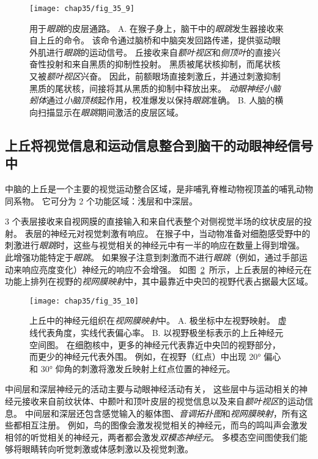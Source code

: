 \begin{figure}[htbp]
	\centering
	\texttt{[image: chap35/fig\_35\_9]}
	\caption{用于\textit{眼跳}的皮层通路。
		A. 在猴子身上，脑干中的\textit{眼跳}发生器接收来自上丘的命令。
		该命令通过脑桥和中脑突发回路传递，提供驱动眼外肌进行\textit{眼跳}的运动信号。
		丘接收来自\textit{额叶视区}和\textit{侧顶叶}的直接兴奋性投射和来自黑质的抑制性投射。
		黑质被尾状核抑制，而尾状核又被\textit{额叶视区}兴奋。
		因此，前额眼场直接刺激丘，并通过刺激抑制黑质的尾状核，间接将其从黑质的抑制中释放出来。
		\textit{动眼神经小脑蚓体}通过\textit{小脑顶核}起作用，校准爆发以保持\textit{眼跳}准确。
		B. 人脑的横向扫描显示在\textit{眼跳}期间激活的皮层区域\cite{curtis2008saccade}。}
	\label{fig:35_9}
\end{figure}



\subsection{上丘将视觉信息和运动信息整合到脑干的动眼神经信号中}

中脑的上丘是一个主要的视觉运动整合区域，是非哺乳脊椎动物视顶盖的哺乳动物同系物。
它可分为 2 个功能区域：浅层和中深层。


3 个表层接收来自视网膜的直接输入和来自代表整个对侧视觉半场的纹状皮层的投射。
表层的神经元对视觉刺激有响应。
在猴子中，当动物准备对细胞感受野中的刺激进行\textit{眼跳}时，这些与视觉相关的神经元中有一半的响应在数量上得到增强。
此增强功能特定于\textit{眼跳}。
如果猴子注意到刺激而不进行\textit{眼跳}（例如，通过手部运动来响应亮度变化）神经元的响应不会增强。
如图~\ref{fig:35_10}~所示，上丘表层的神经元在功能上排列在视野的\textit{视网膜映射}中，其中最靠近中央凹的视野代表占据最大区域。


\begin{figure}[htbp]
	\centering
	\texttt{[image: chap35/fig\_35\_10]}
	\caption{上丘中的神经元组织在\textit{视网膜映射}中。
		A. 极坐标中左视野映射。
		虚线代表角度，实线代表偏心率。
		B. 以视野极坐标表示的上丘神经元空间图。
		在细胞核中，更多的神经元代表靠近中央凹的视野部分，而更少的神经元代表外围。
		例如，在视野（红点）中出现 20° 偏心和 30° 仰角的刺激将激发丘映射上红点位置的神经元\cite{aizawa1998reversible}。}
	\label{fig:35_10}
\end{figure}


中间层和深层神经元的活动主要与动眼神经活动有关，
这些层中与运动相关的神经元接收来自前纹状体、中颞叶和顶叶皮层的视觉信息以及来自\textit{额叶视区}的运动信息。
中间层和深层还包含感觉输入的躯体图、\textit{音调拓扑图}和\textit{视网膜映射}，所有这些都相互注册。
例如，鸟的图像会激发视觉相关的神经元，而鸟的鸣叫声会激发相邻的听觉相关的神经元，两者都会激发\textit{双模态神经元}。
多模态空间图使我们能够将眼睛转向听觉刺激或体感刺激以及视觉刺激。


